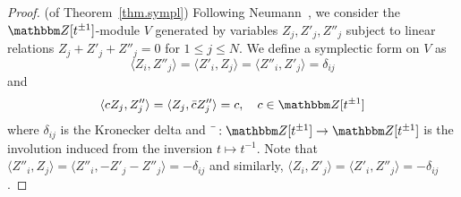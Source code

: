 \documentclass[12pt,reqno]{amsart}
\theoremstyle{definition}
\def\BZ{\mathbbm Z}
\def\be{\begin{equation}}
\def\ee{\end{equation}}
\begin{document}
\begin{proof}(of Theorem~\ref{thm.sympl})
Following Neumann~\cite{Neumann04}, we consider the $\BZ[t^{\pm1}]$-module $V$
generated by variables $Z_j,Z'_j,Z''_j$ subject to linear relations $Z_j+Z'_j+Z''_j=0$
for $ 1 \leq j \leq N$. We define a symplectic form on $V$ as
\be
\label{eqn.inner}
\langle Z_i, Z''_j \rangle = \langle Z'_i, Z_j \rangle = \langle Z''_i, Z'_j \rangle
= \delta_{ij}
\ee
and 
\[
\langle c Z_ j, Z''_j \rangle= \langle Z_ j,  \bar{c} Z''_j \rangle = c, \quad
c \in \BZ[t^{\pm1}]
\]
where $\delta_{ij}$ is the Kronecker delta and
$\bar{\ } : \BZ[t^{\pm1}]\rightarrow\BZ[t^{\pm1}]$ is the involution induced
from the inversion $t \mapsto t^{-1}$. Note that
$\langle Z''_i, Z_j \rangle = \langle Z''_i, -Z'_j - Z''_j\rangle = -\delta_{ij}$
and similarly, $\langle Z_i,Z'_j\rangle = \langle Z'_i,Z''_j \rangle = - \delta_{ij}$.
	

\end{proof}
\end{document}
